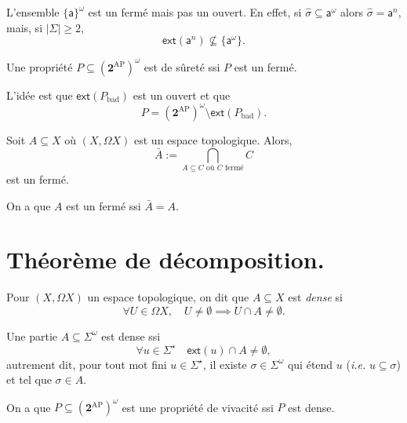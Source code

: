 \documentclass[./main]{subfiles}
\begin{document}
  \begin{exm}
    L'ensemble $\{\mathsf{a}\}^\omega$ est un fermé mais pas un ouvert.
    En effet, si $\hat{\sigma} \subseteq \mathsf{a}^\omega$ alors $\hat{\sigma} = \mathsf{a}^n$, mais, si $|\Sigma| \ge 2$,
    \[
    \mathsf{ext}(\mathsf{a}^n) \not\subseteq \{\mathsf{a}^\omega\} 
    .\]
  \end{exm}

  \begin{crlr}
    Une propriété $P\subseteq (\mathbf{2}^\mathrm{AP})^\omega$ est de sûreté ssi $P$ est un fermé.
  \end{crlr}
  \begin{prv}
    L'idée est que $\mathsf{ext}(P_\mathrm{bad})$ est un ouvert et que \[
    P = (\mathbf{2}^\mathrm{AP})^\omega \setminus \mathsf{ext}(P_\mathrm{bad})
    .\]
  \end{prv}

  \begin{prop}[Clôture]
    Soit $A \subseteq X$ où $(X, \Omega X)$ est un espace topologique.
    Alors, 
    \[
    \bar{A} := \bigcap_{A \subseteq C \text{ où } C \text{ fermé}} C
    \]
    est un fermé.
  \end{prop}


  \begin{rmk}
    On a que $A$ est un fermé ssi $\bar{A} = A$.
  \end{rmk}

  \section{Théorème de décomposition.}

  \begin{defn}
    Pour $(X, \Omega X)$ un espace topologique, on dit que $A \subseteq X$ est \textit{dense} si \[
    \forall U \in \Omega X, \quad U \neq \emptyset \implies U \cap A \neq \emptyset
    .\] 
  \end{defn}

  \begin{exm}
    Une partie $A \subseteq \Sigma^\omega$ est dense ssi 
    \[
    \forall u \in \Sigma^\star \quad \mathsf{ext}(u) \cap A \neq \emptyset
    ,\] 
    autrement dit, pour tout mot fini $u \in \Sigma^\star$, il existe $\sigma \in \Sigma^\omega$ qui étend $u$ (\textit{i.e.} $u \subseteq \sigma$) et tel que $\sigma \in A$.
  \end{exm}

  \begin{lem}
    On a que $P \subseteq (\mathbf{2}^\mathrm{AP})^\omega$ est une propriété de vivacité ssi $P$ est dense.
  \end{lem}
\end{document}
